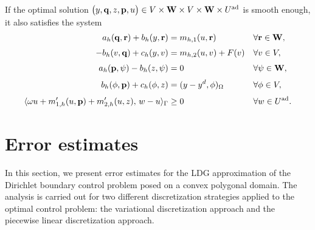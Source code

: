 \documentclass[a4paper,10pt]{article}
\newcommand{\Uad}{{U^{\textup{ad}}}}
\newcommand{\bq}{{\mathbf{q}}}
\newcommand{\br}{{\mathbf{r}}}
\newcommand{\bp}{{\mathbf{p}}}
\newcommand{\bW}{{\mathbf{W}}}
\numberwithin{theorem}{section}
\begin{document}
If the optimal solution $\big( y, \bq, z, \bp, u \big) 
\in V \times \bW \times V \times \bW \times \Uad$ is smooth enough, it also satisfies the system
\begin{subequations}\label{sys:optimality_cont}
\begin{align}
a_h(\bq, \br) + b_h(y, \br) 
&= m_{h,1}(u, \br)
&& \forall \br \in \bW,  \\[0.3em]
-b_h(v, \bq) + c_h(y, v) 
&= m_{h,2}(u, v) + F(v)
&& \forall v \in V, \\[0.3em]
a_h(\bp, \psi) - b_h(z, \psi) 
&= 0
&& \forall \psi \in \bW,  \\[0.3em]
b_h(\phi, \bp) + c_h(\phi, z) 
&= (y - y^d, \phi)_\Omega
&& \forall \phi \in V, \\[0.3em]
\langle \omega u + m'_{1,h}(u, \bp) + m'_{2,h}(u, z), \, w - u \rangle_\Gamma 
&\ge 0
&& \forall w \in \Uad.
\end{align}
\end{subequations}







\section{Error estimates}\label{sec:estimate}

In this section, we present error estimates for the LDG approximation of the Dirichlet boundary control problem posed on a convex polygonal domain. The analysis is carried out for two different discretization strategies applied to the optimal control problem: the variational discretization approach and the piecewise linear discretization approach.
\end{document}
